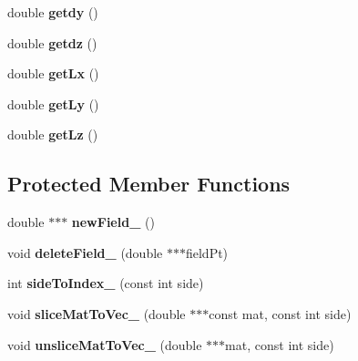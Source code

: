 \begin{DoxyCompactItemize}
double {\bfseries getdy} ()
\item 
\hypertarget{class_grid_afd9f90b7b01e8bf072f0328c9683927c}{}\label{class_grid_afd9f90b7b01e8bf072f0328c9683927c} 
double {\bfseries getdz} ()
\item 
\hypertarget{class_grid_a79f8ff349630daeab0928c5295160789}{}\label{class_grid_a79f8ff349630daeab0928c5295160789} 
double {\bfseries get\+Lx} ()
\item 
\hypertarget{class_grid_a4b845844084784e1feaec7d606aa1298}{}\label{class_grid_a4b845844084784e1feaec7d606aa1298} 
double {\bfseries get\+Ly} ()
\item 
\hypertarget{class_grid_a8b159f067d2b3df26aebbf5408c90fc1}{}\label{class_grid_a8b159f067d2b3df26aebbf5408c90fc1} 
double {\bfseries get\+Lz} ()
\end{DoxyCompactItemize}
\subsection*{Protected Member Functions}
\begin{DoxyCompactItemize}
\item 
\hypertarget{class_grid_a23877f79f95e9a109e908d930c8036b4}{}\label{class_grid_a23877f79f95e9a109e908d930c8036b4} 
double $\ast$$\ast$$\ast$ {\bfseries new\+Field\+\_\+} ()
\item 
\hypertarget{class_grid_acaa1c3843fd96478b3a5e9f62401d8e0}{}\label{class_grid_acaa1c3843fd96478b3a5e9f62401d8e0} 
void {\bfseries delete\+Field\+\_\+} (double $\ast$$\ast$$\ast$field\+Pt)
\item 
\hypertarget{class_grid_a91fc198085fdfeaa6378a99db4dbc6ac}{}\label{class_grid_a91fc198085fdfeaa6378a99db4dbc6ac} 
int {\bfseries side\+To\+Index\+\_\+} (const int side)
\item 
\hypertarget{class_grid_adfae48e6068488739c8823bc575f4f0a}{}\label{class_grid_adfae48e6068488739c8823bc575f4f0a} 
void {\bfseries slice\+Mat\+To\+Vec\+\_\+} (double $\ast$$\ast$$\ast$const mat, const int side)
\item 
\hypertarget{class_grid_a99b9c649ef28f41fa939d4517f504eb0}{}\label{class_grid_a99b9c649ef28f41fa939d4517f504eb0} 
void {\bfseries unslice\+Mat\+To\+Vec\+\_\+} (double $\ast$$\ast$$\ast$mat, const int side)
\end{DoxyCompactItemize}
